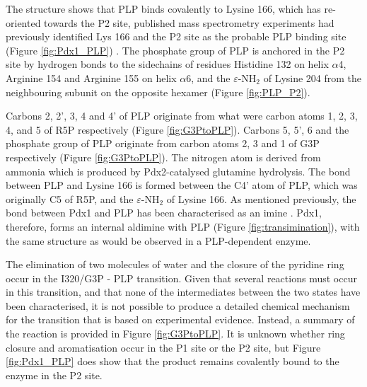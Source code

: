 The structure shows that PLP binds covalently to Lysine 166, which has re-oriented towards the P2 site, published mass spectrometry experiments had previously identified Lys 166 and the P2 site as the probable PLP binding site (Figure \ref{fig:Pdx1_PLP}) \cite{Moccand2011}. The phosphate group of PLP is anchored in the P2 site by hydrogen bonds to the sidechains of residues Histidine 132 on helix $\alpha$4, Arginine 154 and Arginine 155 on helix $\alpha$6, and the $\varepsilon$-NH$_2$ of Lysine 204 from the neighbouring subunit on the opposite hexamer (Figure \ref{fig:PLP_P2}). 

Carbons 2, 2', 3, 4 and 4' of PLP originate from what were carbon atoms 1, 2, 3, 4, and 5 of R5P respectively (Figure \ref{fig:G3PtoPLP}). Carbons 5, 5', 6 and the phosphate group of PLP originate from carbon atoms 2, 3 and 1 of G3P respectively (Figure \ref{fig:G3PtoPLP}). The nitrogen atom is derived from ammonia which is produced by Pdx2-catalysed glutamine hydrolysis. The bond between PLP and Lysine 166 is formed between the C4’ atom of PLP, which was originally C5 of R5P, and the $\varepsilon$-NH$_2$ of Lysine 166. As mentioned previously, the bond between Pdx1 and PLP has been characterised as an imine \cite{Hanes2008b}. Pdx1, therefore, forms an internal aldimine with PLP (Figure \ref{fig:transimination}), with the same structure as would be observed in a PLP-dependent enzyme.


The elimination of two molecules of water and the closure of the pyridine ring occur in the I320/G3P - PLP transition. Given that several reactions must occur in this transition, and that none of the intermediates between the two states have been characterised, it is not possible to produce a detailed chemical mechanism for the transition that is based on experimental evidence. Instead, a summary of the reaction is provided in Figure \ref{fig:G3PtoPLP}. It is unknown whether ring closure and aromatisation occur in the P1 site or the P2 site, but Figure \ref{fig:Pdx1_PLP} does show that the product remains covalently bound to the enzyme in the P2 site.    




